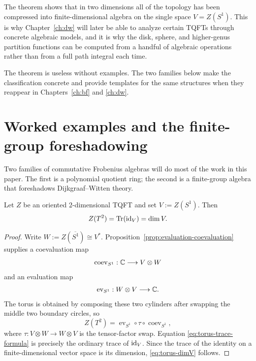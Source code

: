 \begin{remark}\label{rem:why-classification-matters}
The theorem shows that in two dimensions all of the topology has been compressed into finite-dimensional algebra on the single space $V=Z(S^1)$. This is why Chapter~\ref{ch:dw} will later be able to analyze certain TQFTs through concrete algebraic models, and it is why the disk, sphere, and higher-genus partition functions can be computed from a handful of algebraic operations rather than from a full path integral each time.
\end{remark}

\medskip

\noindent The theorem is useless without examples.  The two families below make the classification concrete and provide templates for the same structures when they reappear in Chapters~\ref{ch:bf} and \ref{ch:dw}.

\section{Worked examples and the finite-group foreshadowing}\label{sec:frobenius-examples}

Two families of commutative Frobenius algebras will do most of the work in this paper.  The first is a polynomial quotient ring; the second is a finite-group algebra that foreshadows Dijkgraaf--Witten theory.

\begin{proposition}\label{prop:torus-partition}
Let $Z$ be an oriented $2$-dimensional TQFT and set $V := Z(S^1)$. Then
\begin{equation}\label{eq:torus-dimV}
Z(T^2)=\operatorname{Tr}(\operatorname{id}_V)=\dim V.
\end{equation}
\end{proposition}

\begin{proof}
Write $W := Z(\overline{S^1}) \cong V^*$. Proposition~\ref{prop:evaluation-coevaluation} supplies a coevaluation map
\begin{equation*}
\operatorname{coev}_{S^1} : \mathbb{C} \longrightarrow V \otimes W
\end{equation*}
and an evaluation map
\begin{equation*}
\operatorname{ev}_{S^1} : W \otimes V \longrightarrow \mathbb{C}.
\end{equation*}
The torus is obtained by composing these two cylinders after swapping the middle two boundary circles, so
\begin{equation}\label{eq:torus-trace-formula}
Z(T^2) = \operatorname{ev}_{S^1} \circ \tau \circ \operatorname{coev}_{S^1},
\end{equation}
where $\tau : V \otimes W \to W \otimes V$ is the tensor-factor swap. Equation \eqref{eq:torus-trace-formula} is precisely the ordinary trace of $\operatorname{id}_V$. Since the trace of the identity on a finite-dimensional vector space is its dimension, \eqref{eq:torus-dimV} follows.
\end{proof}

